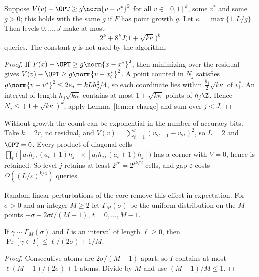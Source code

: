 \begin{proposition}\label{prop:cr-growth}
Suppose $V(v)-\OPT\ge g\norm{v-v^*}^2$ for all $v\in[0,1]^k$, some $v^*$
and some $g>0$; this holds with the same $g$ if $F$ has point growth $g$.
Let $\kappa=\max\{1,L/g\}$. Then levels $0,\ldots,J$ make at most
\[
2^k+8^kJ\bigl(1+\sqrt{k\kappa}\bigr)^k
\]
queries. The constant $g$ is not used by the algorithm.
\end{proposition}
\begin{proof}
If $F(x)-\OPT\ge g\norm{x-x^*}^2$, then minimizing over the residual gives
$V(v)-\OPT\ge g\norm{v-x^*_{\mathcal C}}^2$. A point counted in $N_j$
satisfies $g\norm{v-v^*}^2\le2e_j=kLh_j^2/4$, so each coordinate lies
within $\frac{h_j}2\sqrt{k\kappa}$ of $v^*_i$. An interval of length
$h_j\sqrt{k\kappa}$ contains at most $1+\sqrt{k\kappa}$ points of
$h_j\Z$. Hence $N_j\le(1+\sqrt{k\kappa})^k$; apply
Lemma~\ref{lem:cr-charge} and sum over $j<J$.
\end{proof}

\begin{example}\label{ex:cr-flat}
Without growth the count can be exponential in the number of accuracy
bits. Take $k=2r$, no residual, and $V(v)=\sum_{t=1}^r(v_{2t-1}-v_{2t})^2$,
so $L=2$ and $\OPT=0$. Every product of diagonal cells
$\prod_t\bigl([a_th_j,(a_t+1)h_j]\times[a_th_j,(a_t+1)h_j]\bigr)$ has a
corner with $V=0$, hence is retained. So level $j$ retains at least
$2^{jr}=2^{jk/2}$ cells, and gap $\varepsilon$ costs
$\Omega((L/\varepsilon)^{k/4})$ queries.
\end{example}

Random linear perturbations of the core remove this effect in
expectation. For $\sigma>0$ and an integer $M\ge2$ let $\Gamma_M(\sigma)$
be the uniform distribution on the $M$ points
$-\sigma+2\sigma t/(M-1)$, $t=0,\ldots,M-1$.

\begin{lemma}\label{lem:cr-law}
If $\gamma\sim\Gamma_M(\sigma)$ and $I$ is an interval of length
$\ell\ge0$, then $\Pr[\gamma\in I]\le\ell/(2\sigma)+1/M$.
\end{lemma}
\begin{proof}
Consecutive atoms are $2\sigma/(M-1)$ apart, so $I$ contains at most
$\ell(M-1)/(2\sigma)+1$ atoms. Divide by $M$ and use $(M-1)/M\le1$.
\end{proof}

